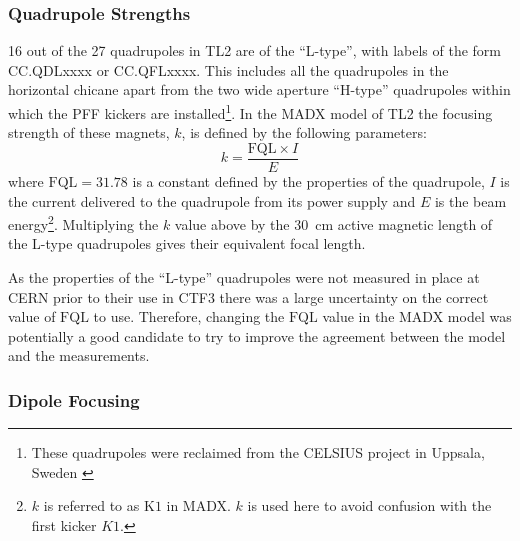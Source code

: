 \subsubsection{Quadrupole Strengths}
\label{sss:quadStrengths}

16 out of the 27 quadrupoles in TL2 are of the ``L-type'', with labels of the form CC.QDLxxxx or CC.QFLxxxx. This includes all the quadrupoles in the horizontal chicane apart from the two wide aperture ``H-type'' quadrupoles within which the PFF kickers are installed\footnote{These quadrupoles were reclaimed from the CELSIUS project in Uppsala, Sweden \cite{celsius}}. In the MADX model of TL2 the focusing strength of these magnets, \(k\), is defined by the following parameters:
\begin{equation}
k = \frac{\mathrm{FQL}\times I}{E}
\end{equation}
where \(\mathrm{FQL} = 31.78\) is a constant defined by the properties of the quadrupole, \(I\) is the current delivered to the quadrupole from its power supply and \(E\) is the beam energy\footnote{\(k\) is referred to as \(\mathrm{K1}\) in MADX. \(k\) is used here to avoid confusion with the first kicker \(K1\).}. 
Multiplying the \(k\) value above by the 30~cm active magnetic length of the L-type quadrupoles gives their equivalent focal length.

As the properties of the ``L-type'' quadrupoles were not measured in place at CERN prior to their use in CTF3 there was a large uncertainty on the correct value of \(\mathrm{FQL}\) to use. Therefore, changing the \(\mathrm{FQL}\) value in the MADX model was potentially a good candidate to try to improve the agreement between the model and the measurements.

\subsubsection{Dipole Focusing}
\label{sss:edgeFocusing}

